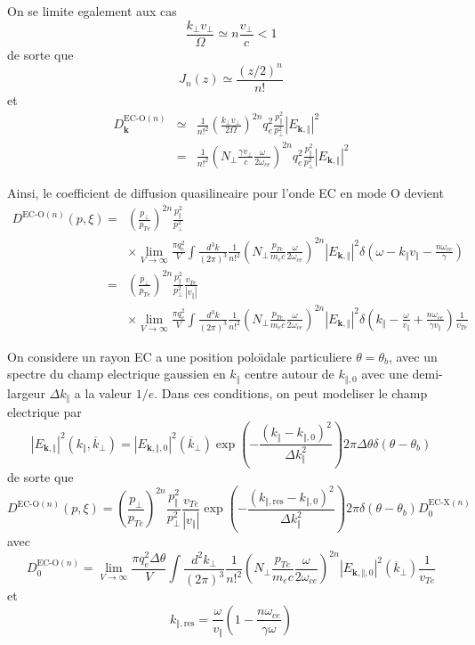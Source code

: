 On se limite egalement aux cas \[
\frac{k_{\bot}v_{\bot}}{\Omega}\simeq n\frac{v_{\bot}}{c}<1\]
 de sorte que \[
J_{n}(z)\simeq\frac{(z/2)^{n}}{n!}\]
 et \begin{eqnarray*}
D_{\mathbf{k}}^{\text{EC-O}(n)} & \simeq & \frac{1}{n!^{2}}\left(\frac{k_{\bot}v_{\bot}}{2\Omega}\right)^{2n}q_{e}^{2}\frac{p_{\Vert}^{2}}{p_{\bot}^{2}}\left|E_{\mathbf{k},\Vert}\right|^{2}\\
 & = & \frac{1}{n!^{2}}\left(N_{\bot}\frac{\gamma v_{\bot}}{c}\frac{\omega}{2\omega_{ce}}\right)^{2n}q_{e}^{2}\frac{p_{\Vert}^{2}}{p_{\bot}^{2}}\left|E_{\mathbf{k},\Vert}\right|^{2}\end{eqnarray*}


Ainsi, le coefficient de diffusion quasilineaire pour l'onde EC en
mode O devient \begin{eqnarray*}
D^{\text{EC-O}(n)}(p,\xi) & = & \left(\frac{p_{\bot}}{p_{Te}}\right)^{2n}\frac{p_{\Vert}^{2}}{p_{\bot}^{2}}\\
 &  & \times\lim_{V\rightarrow\infty}\frac{\pi q_{e}^{2}}{V}\int\frac{d^{3}k}{(2\pi)^{3}}\frac{1}{n!^{2}}\left(N_{\bot}\frac{p_{Te}}{m_{e}c}\frac{\omega}{2\omega_{ce}}\right)^{2n}\left|E_{\mathbf{k},\Vert}\right|^{2}\delta\left(\omega-k_{\Vert}v_{\Vert}-\frac{n\omega_{ce}}{\gamma}\right)\\
 & = & \left(\frac{p_{\bot}}{p_{Te}}\right)^{2n}\frac{p_{\Vert}^{2}}{p_{\bot}^{2}}\frac{v_{Te}}{\left|v_{\Vert}\right|}\\
 &  & \times\lim_{V\rightarrow\infty}\frac{\pi q_{e}^{2}}{V}\int\frac{d^{3}k}{(2\pi)^{3}}\frac{1}{n!^{2}}\left(N_{\bot}\frac{p_{Te}}{m_{e}c}\frac{\omega}{2\omega_{ce}}\right)^{2n}\left|E_{\mathbf{k},\Vert}\right|^{2}\delta\left(k_{\Vert}-\frac{\omega}{v_{\Vert}}+\frac{n\omega_{ce}}{\gamma v_{\Vert}}\right)\frac{1}{v_{Te}}\end{eqnarray*}


On considere un rayon EC a une position polo\"{\i}dale particuliere
$\theta=\theta_{b}$, avec un spectre du champ electrique gaussien
en $k_{\Vert}$ centre autour de $k_{\Vert,0}$ avec une demi-largeur
$\Delta k_{\Vert}$ a la valeur $1/e$. Dans ces conditions, on peut
modeliser le champ electrique par \[
\left|E_{\mathbf{k},\Vert}\right|^{2}(k_{\Vert},\overline{k}_{\bot})=\left|E_{\mathbf{k},\Vert,0}\right|^{2}(\overline{k}_{\bot})\exp\left(-\frac{\left(k_{\Vert}-k_{\Vert,0}\right)^{2}}{\Delta k_{\Vert}^{2}}\right)2\pi\Delta\theta\delta(\theta-\theta_{b})\]
 de sorte que \[
D^{\text{EC-O}(n)}(p,\xi)=\left(\frac{p_{\bot}}{p_{Te}}\right)^{2n}\frac{p_{\Vert}^{2}}{p_{\bot}^{2}}\frac{v_{Te}}{\left|v_{\Vert}\right|}\exp\left(-\frac{\left(k_{\Vert,\text{res}}-k_{\Vert,0}\right)^{2}}{\Delta k_{\Vert}^{2}}\right)2\pi\delta(\theta-\theta_{b})D_{0}^{\text{EC-X}(n)}\]
 avec \[
D_{0}^{\text{EC-O}(n)}=\lim_{V\rightarrow\infty}\frac{\pi q_{e}^{2}\Delta\theta}{V}\int\frac{d^{2}k_{\bot}}{(2\pi)^{3}}\frac{1}{n!^{2}}\left(N_{\bot}\frac{p_{Te}}{m_{e}c}\frac{\omega}{2\omega_{ce}}\right)^{2n}\left|E_{\mathbf{k},\Vert,0}\right|^{2}(\overline{k}_{\bot})\frac{1}{v_{Te}}\]
 et \[
k_{\Vert,\text{res}}=\frac{\omega}{v_{\Vert}}\left(1-\frac{n\omega_{ce}}{\gamma\omega}\right)\]


